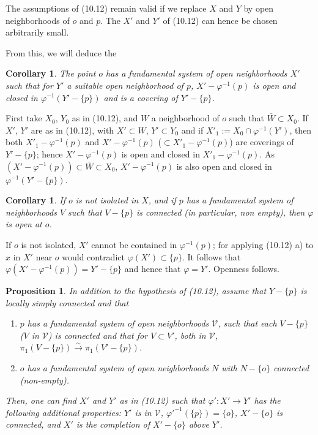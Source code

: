 \documentclass[12pt,a4paper]{article}
\theoremstyle{plain}
\newtheorem{proposition}[theorem]{Proposition}
\newtheorem{corollary}[theorem]{Corollary}
\theoremstyle{definition}
\theoremstyle{remark}
\begin{document}
The assumptions of (10.12) remain valid if we replace $X$ and $Y$ by open neighborhoods of $o$ and $p$. The $X'$ and $Y'$ of (10.12) can hence be chosen arbitrarily small.

From this, we will deduce the

\begin{corollary}
\label{10.12.2}
The point $o$ has a fundamental system of open neighborhoods $X'$ such that for $Y'$ a suitable open neighborhood of $p$, $X' - \varphi^{-1}(p)$ is open and closed in $\varphi^{-1}(Y' - \{p\})$ and is a covering of $Y' - \{p\}$.
\end{corollary}

First take $X_0$, $Y_0$ as in (10.12), and $W$ a neighborhood of $o$ such that $\bar{W} \subset X_0$. If $X'$, $Y'$ are as in (10.12), with $X' \subset W$, $Y' \subset Y_0$ and if $X'_1 := X_0 \cap \varphi^{-1}(Y')$, then both $X'_1 - \varphi^{-1}(p)$ and $X' - \varphi^{-1}(p)$ ($\subset X'_1 - \varphi^{-1}(p)$) are coverings of $Y' - \{p\}$; hence $X' - \varphi^{-1}(p)$ is open and closed in $X'_1 - \varphi^{-1}(p)$. As $(X' - \varphi^{-1}(p)) \subset \bar{W} \subset X_0$, $X' - \varphi^{-1}(p)$ is also open and closed in $\varphi^{-1}(Y' - \{p\})$.

\begin{corollary}
\label{10.12.3}
If $o$ is not isolated in $X$, and if $p$ has a fundamental system of neighborhoods $V$ such that $V - \{p\}$ is connected (in particular, non empty), then $\varphi$ is open at $o$.
\end{corollary}

If $o$ is not isolated, $X'$ cannot be contained in $\varphi^{-1}(p)$; for applying (10.12) a) to $x$ in $X'$ near $o$ would contradict $\varphi(X') \subset \{p\}$. It follows that $\varphi(X' - \varphi^{-1}(p)) = Y' - \{p\}$ and hence that $\varphi = Y'$. Openness follows.

\begin{proposition}
\label{10.13}
In addition to the hypothesis of (10.12), assume that $Y - \{p\}$ is locally simply connected and that
\begin{enumerate}
\item[c)] $p$ has a fundamental system of open neighborhoods $\mathscr{V}$, such that each $V - \{p\}$ ($V$ in $\mathscr{V}$) is connected and that for $V \subset V'$, both in $\mathscr{V}$, $\pi_1(V - \{p\}) \xrightarrow{\sim} \pi_1(V' - \{p\})$.
\item[d)] $o$ has a fundamental system of open neighborhoods $N$ with $N - \{o\}$ connected (non-empty).
\end{enumerate}
Then, one can find $X'$ and $Y'$ as in (10.12) such that $\varphi' : X' \to Y'$ has the following additional properties: $Y'$ is in $\mathscr{V}$, $\varphi'^{-1}(\{p\}) = \{o\}$, $X' - \{o\}$ is connected, and $X'$ is the completion of $X' - \{o\}$ above $Y'$.
\end{proposition}
\end{document}
